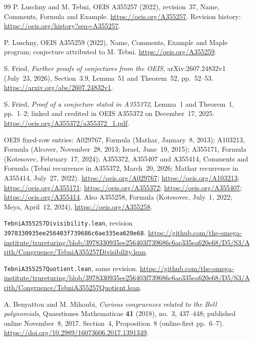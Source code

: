 \documentclass[11pt]{article}
\begin{document}
\begin{thebibliography}{99}
P. Luschny and M. Tebni, OEIS A355257 (2022), revision~37,
Name, Comments, Formula and Example.
\url{https://oeis.org/A355257}.
Revision history: \url{https://oeis.org/history?seq=A355257}.

P. Luschny, OEIS A355259 (2022), Name, Comments, Example and
Maple program; conjecture attributed to M. Tebni.
\url{https://oeis.org/A355259}.

S. Fried, \emph{Further proofs of conjectures from the OEIS},
arXiv:2607.24832v1 (July~23, 2026), Section~3.9,
Lemma~51 and Theorem~52, pp.~52--53.
\url{https://arxiv.org/abs/2607.24832v1}.

S. Fried, \emph{Proof of a conjecture stated in A355372},
Lemma~1 and Theorem~1, pp.~1--2; linked and credited in
OEIS A355372 on December~17, 2025.
\url{https://oeis.org/A355372/a355372_1.pdf}.

OEIS fixed-row entries: A029767, Formula (Mathar, January~8, 2013);
A103213, Formula (Alcover, November~28, 2013; Israel, June~19, 2015);
A355171, Formula (Kotesovec, February~17, 2024);
A355372, A355407 and A355414, Comments and Formula
(Tebni recurrence in A355372, March~20, 2026;
Mathar recurrence in A355414, July~27, 2022).
\url{https://oeis.org/A029767}; \url{https://oeis.org/A103213};
\url{https://oeis.org/A355171}; \url{https://oeis.org/A355372};
\url{https://oeis.org/A355407}; \url{https://oeis.org/A355414}.
Also A355258, Formula (Kotesovec, July~1, 2022; Meya, April~12, 2024),
\url{https://oeis.org/A355258}.

\texttt{TebniA355257Divisibility.lean}, revision
\texttt{3978330935ee256403f739686c6ae335ea620e68}.
\url{https://github.com/the-omega-institute/trureturing/blob/3978330935ee256403f739686c6ae335ea620e68/D5/S3/Arith/Congruence/TebniA355257Divisibility.lean}.

\texttt{TebniA355257Quotient.lean}, same revision.
\url{https://github.com/the-omega-institute/trureturing/blob/3978330935ee256403f739686c6ae335ea620e68/D5/S3/Arith/Congruence/TebniA355257Quotient.lean}.

A. Benyattou and M. Mihoubi, \emph{Curious congruences related to the
Bell polynomials}, Quaestiones Mathematicae \textbf{41} (2018), no.~3,
437--448; published online November~8, 2017. Section~4, Proposition~8
(online-first pp.~6--7).
\url{https://doi.org/10.2989/16073606.2017.1391349}.


\end{thebibliography}
\end{document}
